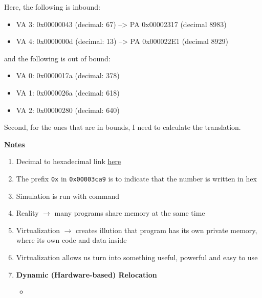 \documentclass[12pt]{article}
\begin{document}
\begin{enumerate}[1.]
\begin{itemize}
        \bigskip

        Here, the following is inbound:

        \begin{itemize}
            \item VA  3: 0x00000043 (decimal:   67) --> PA 0x00002317 (decimal 8983)
            \item VA  4: 0x0000000d (decimal:   13) --> PA 0x000022E1 (decimal 8929)
        \end{itemize}

        \bigskip

        and the following is out of bound:

        \begin{itemize}
            \item VA  0: 0x0000017a (decimal:  378)
            \item VA  1: 0x0000026a (decimal:  618)
            \item VA  2: 0x00000280 (decimal:  640)
        \end{itemize}
    \end{itemize}



    \bigskip

    Second, for the ones that are in bounds, I need to calculate the translation.

    \underline{\textbf{Notes}}

    \begin{enumerate}[1.]
        \item Decimal to hexadecimal link \href{https://www.binaryhexconverter.com/decimal-to-hex-converter}{here}
        \item The prefix \texttt{0x} in \texttt{0x00003ca9} is to indicate that the number is written in hex
        \item Simulation is run with command
        \item Reality $\to$ many programs share memory at the same time
        \item Virtualization $\to$ creates illution that program has its own private
        memory, where its own code and data inside
        \item Virtualization allows us turn into something useful, powerful and easy to use
        \item \textbf{Dynamic (Hardware-based) Relocation}

        \begin{itemize}
            \item
        \end{itemize}
    \end{enumerate}
\end{enumerate}
\end{document}
